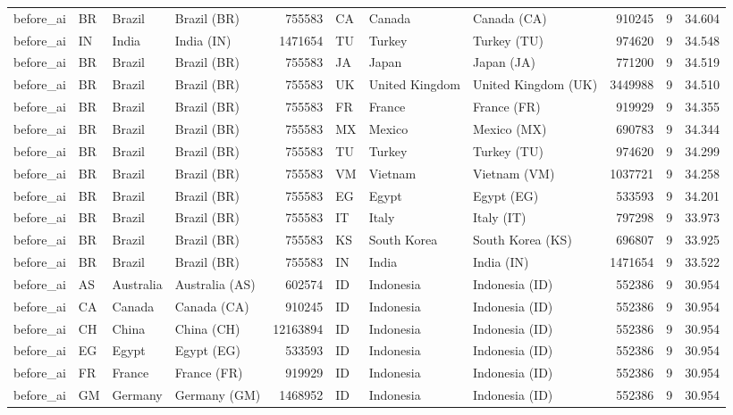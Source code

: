 \begin{tabular}{llllrlllrrr}
before\_ai & BR & Brazil & Brazil (BR) & 755583 & CA & Canada & Canada (CA) & 910245 & 9 & 34.604 \\
before\_ai & IN & India & India (IN) & 1471654 & TU & Turkey & Turkey (TU) & 974620 & 9 & 34.548 \\
before\_ai & BR & Brazil & Brazil (BR) & 755583 & JA & Japan & Japan (JA) & 771200 & 9 & 34.519 \\
before\_ai & BR & Brazil & Brazil (BR) & 755583 & UK & United Kingdom & United Kingdom (UK) & 3449988 & 9 & 34.510 \\
before\_ai & BR & Brazil & Brazil (BR) & 755583 & FR & France & France (FR) & 919929 & 9 & 34.355 \\
before\_ai & BR & Brazil & Brazil (BR) & 755583 & MX & Mexico & Mexico (MX) & 690783 & 9 & 34.344 \\
before\_ai & BR & Brazil & Brazil (BR) & 755583 & TU & Turkey & Turkey (TU) & 974620 & 9 & 34.299 \\
before\_ai & BR & Brazil & Brazil (BR) & 755583 & VM & Vietnam & Vietnam (VM) & 1037721 & 9 & 34.258 \\
before\_ai & BR & Brazil & Brazil (BR) & 755583 & EG & Egypt & Egypt (EG) & 533593 & 9 & 34.201 \\
before\_ai & BR & Brazil & Brazil (BR) & 755583 & IT & Italy & Italy (IT) & 797298 & 9 & 33.973 \\
before\_ai & BR & Brazil & Brazil (BR) & 755583 & KS & South Korea & South Korea (KS) & 696807 & 9 & 33.925 \\
before\_ai & BR & Brazil & Brazil (BR) & 755583 & IN & India & India (IN) & 1471654 & 9 & 33.522 \\
before\_ai & AS & Australia & Australia (AS) & 602574 & ID & Indonesia & Indonesia (ID) & 552386 & 9 & 30.954 \\
before\_ai & CA & Canada & Canada (CA) & 910245 & ID & Indonesia & Indonesia (ID) & 552386 & 9 & 30.954 \\
before\_ai & CH & China & China (CH) & 12163894 & ID & Indonesia & Indonesia (ID) & 552386 & 9 & 30.954 \\
before\_ai & EG & Egypt & Egypt (EG) & 533593 & ID & Indonesia & Indonesia (ID) & 552386 & 9 & 30.954 \\
before\_ai & FR & France & France (FR) & 919929 & ID & Indonesia & Indonesia (ID) & 552386 & 9 & 30.954 \\
before\_ai & GM & Germany & Germany (GM) & 1468952 & ID & Indonesia & Indonesia (ID) & 552386 & 9 & 30.954 \\

\end{tabular}

